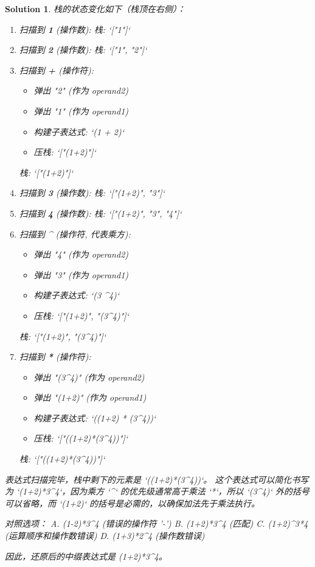 \documentclass[UTF8]{report}
\newtheorem{solution}{Solution}
\theoremstyle{MyLineTheoremStyle} %
\theoremstyle{MyBlockTheoremStyle} %
\theoremstyle{MySubsubsectionStyle} %
\begin{document}
\begin{solution}
栈的状态变化如下（栈顶在右侧）：
\begin{enumerate}
    \item 扫描到 \textbf{1} (操作数):
          栈: `["1"]`
    \item 扫描到 \textbf{2} (操作数):
          栈: `["1", "2"]`
    \item 扫描到 \textbf{+} (操作符):
        \begin{itemize}
            \item 弹出 "2" (作为 operand2)
            \item 弹出 "1" (作为 operand1)
            \item 构建子表达式: `(1 + 2)`
            \item 压栈: `["(1+2)"]`
        \end{itemize}
          栈: `["(1+2)"]`
    \item 扫描到 \textbf{3} (操作数):
          栈: `["(1+2)", "3"]`
    \item 扫描到 \textbf{4} (操作数):
          栈: `["(1+2)", "3", "4"]`
    \item 扫描到 \textbf{\textasciicircum} (操作符, 代表乘方):
        \begin{itemize}
            \item 弹出 "4" (作为 operand2)
            \item 弹出 "3" (作为 operand1)
            \item 构建子表达式: `(3 \textasciicircum 4)`
            \item 压栈: `["(1+2)", "(3\textasciicircum4)"]`
        \end{itemize}
          栈: `["(1+2)", "(3\textasciicircum4)"]`
    \item 扫描到 \textbf{*} (操作符):
        \begin{itemize}
            \item 弹出 "(3\textasciicircum4)" (作为 operand2)
            \item 弹出 "(1+2)" (作为 operand1)
            \item 构建子表达式: `((1+2) * (3\textasciicircum4))`
            \item 压栈: `["((1+2)*(3\textasciicircum4))"]`
        \end{itemize}
          栈: `["((1+2)*(3\textasciicircum4))"]`
\end{enumerate}

表达式扫描完毕，栈中剩下的元素是 `((1+2)*(3\textasciicircum4))`。
这个表达式可以简化书写为 `(1+2)*3\textasciicircum4`，因为乘方 `\textasciicircum` 的优先级通常高于乘法 `*`，所以 `(3\textasciicircum4)` 外的括号可以省略，而 `(1+2)` 的括号是必需的，以确保加法先于乘法执行。

对照选项：
A. (1-2)*3\textasciicircum4  (错误的操作符 '-')
B. (1+2)*3\textasciicircum4  (匹配)
C. (1+2)\textasciicircum3*4  (运算顺序和操作数错误)
D. (1+3)*2\textasciicircum4  (操作数错误)

因此，还原后的中缀表达式是 (1+2)*3\textasciicircum4。
\end{solution}
\end{document}
